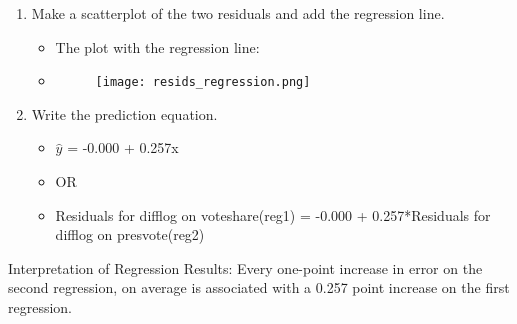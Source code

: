 \documentclass[12pt,letterpaper]{article}
\begin{document}
\begin{enumerate}
		\item Make a scatterplot of the two residuals and add the regression line. 	
		
	
\begin{itemize}
		\item The plot with the regression line:
	\item 
	\begin{figure}[h]
		\centering
		\texttt{[image: resids\_regression.png]}
	\end{figure}
\end{itemize}	
	

		\item Write the prediction equation.
		
\begin{itemize}
	\item $\hat{y}$ = -0.000 + 0.257x
	\item OR
	\item Residuals for difflog on voteshare(reg1) = -0.000 + 0.257*Residuals for difflog on presvote(reg2)
\end{itemize}


	\end{enumerate}
	
Interpretation of Regression Results: Every one-point increase in error on the second regression, on average is associated with a 0.257 point increase on the first regression.

\vspace{1cm}
\end{document}

